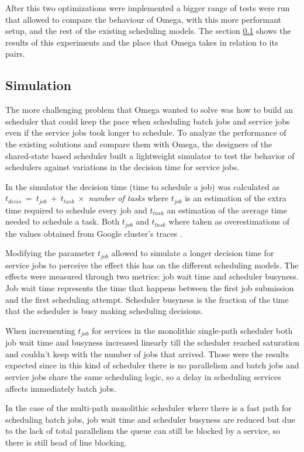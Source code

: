 \documentclass{article}                     %
\begin{document}
After this two optimizations were implemented a bigger range
of tests were run that allowed to compare the behaviour of Omega, with
this more performant setup, and the rest of the existing scheduling
models. The section \ref{sec:simulation} shows the results of this
experiments and the place that Omega takes in relation to its pairs.

\subsection{Simulation}
\label{sec:simulation}

The more challenging problem that Omega wanted to solve was how
to build an scheduler that could keep the pace when scheduling batch
jobs and service jobs even if the service jobs took longer to
schedule. To analyze the performance of the existing solutions and
compare them with Omega, the designers of the shared-state based
scheduler built a lightweight simulator to test the behavior of
schedulers against variations in the decision time for service jobs.

In the simulator the decision time (time to schedule a job) was
calculated as
$t_{decis}\ =\ t_{job}\ +\ t_{task}\ \times$ \emph{number of tasks}
where $t_{job}$ is an estimation of the extra time required to schedule
every job and $t_{task}$ an estimation of the average time needed to
schedule a task. Both $t_{job}$ and $t_{task}$ where taken as
overestimations of the values obtained from Google cluster's traces
\cite{37201}. 

Modifying the parameter $t_{job}$ allowed to simulate a longer
decision time for service jobs to perceive the effect this has on the
different scheduling models. The effects were measured through two
metrics: job wait time and scheduler busyness. Job wait time
represents the time that happens between the first job submission and
the first scheduling attempt. Scheduler busyness is the fraction of
the time that the scheduler is busy making scheduling decisions.

When incrementing $t_{job}$ for services in the monolithic single-path
scheduler both job wait time and busyness increased linearly till the
scheduler reached saturation and couldn't keep with the number of jobs
that arrived. Those were the results expected since in this kind of
scheduler there is no parallelism and batch jobs and service jobs share
the same scheduling logic, so a delay in scheduling services affects
immediately batch jobs.

In the case of the multi-path monolithic scheduler where there is
a fast path for scheduling batch jobs, job wait time and scheduler
busyness are reduced but due to the lack of total parallelism the queue can
still be blocked by a service, so there is still head of line blocking.
\end{document}
